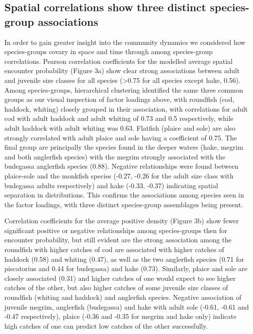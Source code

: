 \documentclass{nature}
\begin{document}
\begin{linenumbers}
\subsection{Spatial correlations show three distinct species-group
	associations} In order to gain greater insight into the community
dynamics we considered how species-groups covary in space and time through
among species-group correlations. Pearson correlation coefficients for the
modelled average spatial encounter probability (Figure 3a) show clear strong
associations between adult and juvenile size classes for all species
(\textgreater 0.75 for all species except hake, 0.56).  Among species-groups,
hierarchical clustering identified the same three common groups as our visual
inspection of factor loadings above, with roundfish (cod, haddock, whiting)
closely grouped in their association, with correlations for adult cod with
adult haddock and adult whiting of 0.73 and 0.5 respectively, while adult
haddock with adult whiting was 0.63. Flatfish (plaice and sole) are also
strongly correlated with adult plaice and sole having a coefficient of 0.75.
The final group are principally the species found in the deeper waters (hake,
megrim and both anglerfish species) with the megrim strongly associated with
the budegassa anglerfish species (0.88). Negative relationships were found
between plaice-sole and the monkfish species (-0.27, -0.26 for the adult size
class with budegassa adults respectively) and hake (-0.33, -0.37) indicating
spatial separation in distributions. This confirms the associations among
species seen in the factor loadings, with three distinct species-group
assemblages being present.

Correlation coefficients for the average positive density (Figure 3b) show
fewer significant positive or negative relationships among species-groups then
for encounter probability, but still evident are the strong association among
the roundfish with higher catches of cod are associated with higher catches of
haddock (0.58) and whiting (0.47), as well as the two anglerfish species (0.71
for piscatorius and 0.44 for budegassa) and hake (0.73). Similarly, plaice and
sole are closely associated (0.31) and higher catches of one would expect to
see higher catches of the other, but also higher catches of some juvenile size
classes of roundfish (whiting and haddock) and anglerfish species. Negative
association of juvenile megrim, anglerfish (budegassa) and hake with adult sole
(-0.61, -0.61 and -0.47 respectively), plaice (-0.36 and -0.35 for megrim and
hake only) indicate high catches of one can predict low catches of the other
successfully.


\end{linenumbers}
\end{document}
